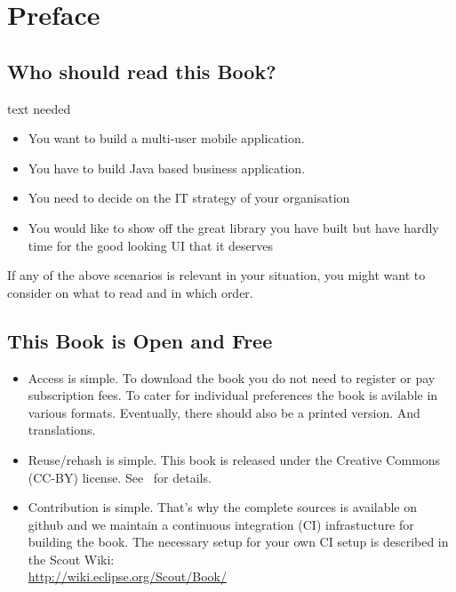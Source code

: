 \documentclass[a4paper,10pt,twoside]{book}
\begin{document}
  \sloppy
\fi


\chapter{Preface}


\section*{Who should read this Book?}

text needed

\begin{itemize}
\item You want to build a multi-user mobile application.
\item You have to build Java based business application. 
\item You need to decide on the IT strategy of your organisation
\item You would like to show off the great library you have built but have hardly time for the good looking UI that it deserves
\end{itemize}

If any of the above scenarios is relevant in your situation, you might want
to consider  on what to read and in which order.

\section*{This Book is Open and Free}

\begin{itemize}
\item Access is simple. To download the book you do not need to register or pay subscription fees. 
To cater for individual preferences the book is avilable in various formats. 
Eventually, there should also be a printed version. And translations.

\item Reuse/rehash is simple. This book is released under the Creative Commons (CC-BY)
license. See~ for details.

\item Contribution is simple. That's why the complete sources is available on github
and we maintain a continuous integration (CI) infrastucture for building the book. 
The necessary setup for your own CI setup is described in the Scout Wiki: \\
\url{http://wiki.eclipse.org/Scout/Book/}
\end{itemize}
\end{document}
